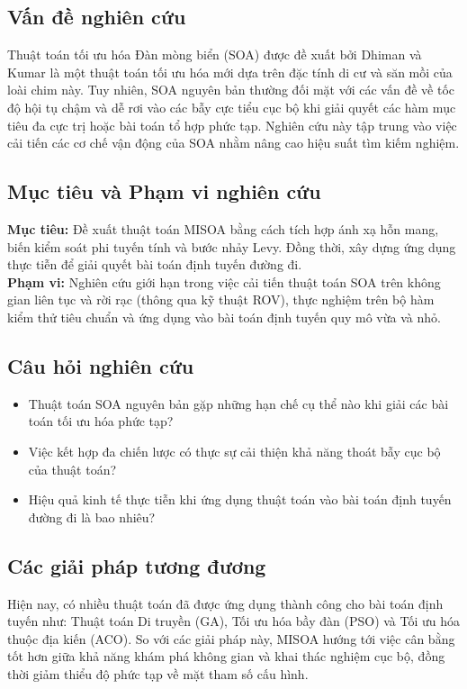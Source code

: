 \documentclass[12pt, a4paper]{article}
\begin{document}
\subsection{Vấn đề nghiên cứu}
Thuật toán tối ưu hóa Đàn mòng biển (SOA) được đề xuất bởi Dhiman và Kumar \cite{soa_original} là một thuật toán tối ưu hóa mới dựa trên đặc tính di cư và săn mồi của loài chim này. Tuy nhiên, SOA nguyên bản thường đối mặt với các vấn đề về tốc độ hội tụ chậm và dễ rơi vào các bẫy cực tiểu cục bộ khi giải quyết các hàm mục tiêu đa cực trị hoặc bài toán tổ hợp phức tạp. Nghiên cứu này tập trung vào việc cải tiến các cơ chế vận động của SOA nhằm nâng cao hiệu suất tìm kiếm nghiệm.

\subsection{Mục tiêu và Phạm vi nghiên cứu}
\textbf{Mục tiêu:} Đề xuất thuật toán MISOA bằng cách tích hợp ánh xạ hỗn mang, biến kiểm soát phi tuyến tính và bước nhảy Levy. Đồng thời, xây dựng ứng dụng thực tiễn để giải quyết bài toán định tuyến đường đi. \\
\textbf{Phạm vi:} Nghiên cứu giới hạn trong việc cải tiến thuật toán SOA trên không gian liên tục và rời rạc (thông qua kỹ thuật ROV), thực nghiệm trên bộ hàm kiểm thử tiêu chuẩn và ứng dụng vào bài toán định tuyến quy mô vừa và nhỏ.

\subsection{Câu hỏi nghiên cứu}
\begin{itemize}
    \item Thuật toán SOA nguyên bản gặp những hạn chế cụ thể nào khi giải các bài toán tối ưu hóa phức tạp?
    \item Việc kết hợp đa chiến lược có thực sự cải thiện khả năng thoát bẫy cục bộ của thuật toán?
    \item Hiệu quả kinh tế thực tiễn khi ứng dụng thuật toán vào bài toán định tuyến đường đi là bao nhiêu?
\end{itemize}

\subsection{Các giải pháp tương đương}
Hiện nay, có nhiều thuật toán đã được ứng dụng thành công cho bài toán định tuyến như: Thuật toán Di truyền (GA), Tối ưu hóa bầy đàn (PSO) và Tối ưu hóa thuộc địa kiến (ACO). So với các giải pháp này, MISOA hướng tới việc cân bằng tốt hơn giữa khả năng khám phá không gian và khai thác nghiệm cục bộ, đồng thời giảm thiểu độ phức tạp về mặt tham số cấu hình.
\end{document}
